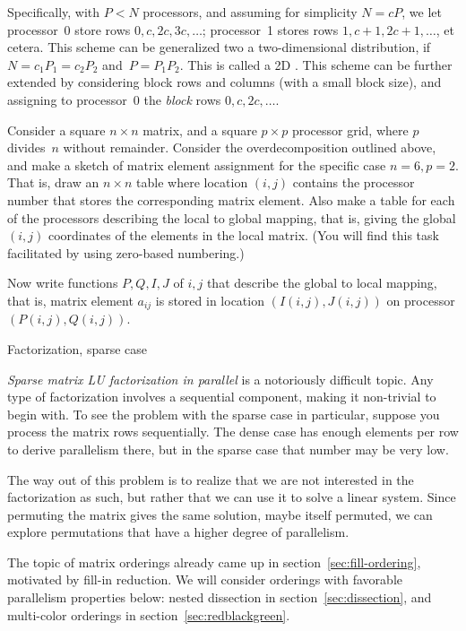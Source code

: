 Specifically,
with $P<N$ processors, and assuming for simplicity $N=cP$, we let
processor~0 store rows $0,c,2c,3c,\ldots$; processor~1 stores rows
$1,c+1,2c+1,\ldots$, et cetera. This scheme can be generalized two a
two-dimensional distribution, if $N=c_1P_1=c_2P_2$
and~$P=P_1P_2$. This is called a 2D . This scheme can be further extended by considering
block rows and columns (with a small block size), and assigning to
processor~0 the \emph{block} rows $0,c,2c,\ldots$.

\begin{exercise}
  Consider a square $n\times n$ matrix, and a square $p\times p$
  processor grid, where $p$ divides~$n$ without remainder. Consider
  the overdecomposition outlined above, and make a sketch of matrix
  element assignment for the specific case $n=6,p=2$. That is, draw an
  $n\times n$ table where location $(i,j)$ contains the processor
  number that stores the corresponding matrix element. Also make a
  table for each of the processors describing the local to global mapping,
  that is, giving the global $(i,j)$ coordinates of the elements in
  the local matrix. (You will find this task facilitated by using
  zero-based numbering.)

  Now write functions $P,Q,I,J$ of $i,j$ that describe the global to
  local mapping, that is, matrix element $a_{ij}$ is stored in
  location $(I(i,j),J(i,j))$ on processor $(P(i,j),Q(i,j))$.
\end{exercise}



 {Factorization, sparse case}

\emph{Sparse matrix LU factorization in parallel} is a notoriously
difficult topic. Any type of factorization involves a sequential
component, making it non-trivial to begin with. To see the problem
with the sparse case in particular, suppose you process
the matrix rows sequentially. The dense case has enough elements per
row to derive parallelism there, but in the sparse case that number
may be very low.

The way out of this problem is to realize that we are not interested
in the factorization as such, but rather that we can use it to solve a
linear system. Since permuting the matrix gives the same solution,
maybe itself permuted, we can explore permutations that have a higher
degree of parallelism.

The topic of matrix orderings already came up in
section~\ref{sec:fill-ordering}, motivated by fill-in reduction.
We will consider orderings with favorable parallelism properties
below: nested dissection in section~\ref{sec:dissection}, and
multi-color orderings in section~\ref{sec:redblackgreen}.


